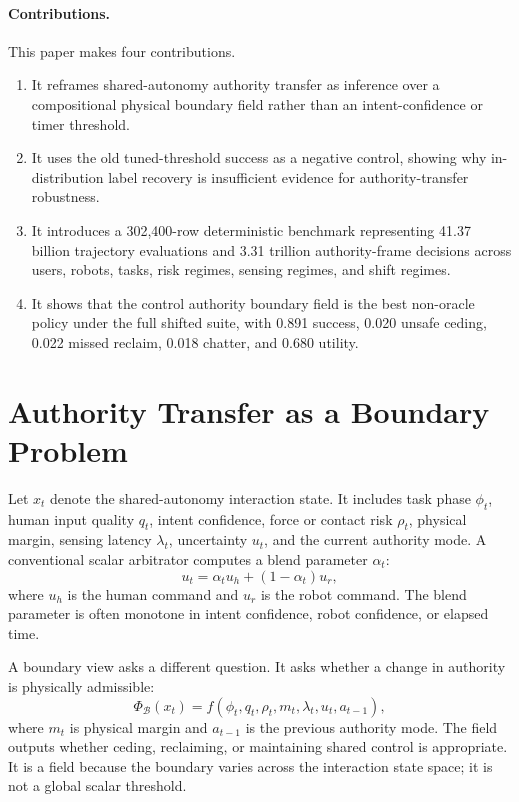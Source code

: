 \documentclass{article}
\newcommand{\state}{x}
\newcommand{\boundary}{\mathcal{B}}
\newcommand{\field}{\Phi_{\boundary}}
\newcommand{\risk}{\rho}
\newcommand{\quality}{q}
\newcommand{\phase}{\phi}
\newcommand{\latency}{\lambda}
\newcommand{\uncert}{u}
\begin{document}
\paragraph{Contributions.}
This paper makes four contributions.
\begin{enumerate}[leftmargin=1.5em]
\item It reframes shared-autonomy authority transfer as inference over a compositional physical boundary field rather than an intent-confidence or timer threshold.
\item It uses the old tuned-threshold success as a negative control, showing why in-distribution label recovery is insufficient evidence for authority-transfer robustness.
\item It introduces a 302,400-row deterministic benchmark representing 41.37 billion trajectory evaluations and 3.31 trillion authority-frame decisions across users, robots, tasks, risk regimes, sensing regimes, and shift regimes.
\item It shows that the control authority boundary field is the best non-oracle policy under the full shifted suite, with 0.891 success, 0.020 unsafe ceding, 0.022 missed reclaim, 0.018 chatter, and 0.680 utility.
\end{enumerate}

\section{Authority Transfer as a Boundary Problem}

Let $\state_t$ denote the shared-autonomy interaction state. It includes task phase $\phase_t$, human input quality $\quality_t$, intent confidence, force or contact risk $\risk_t$, physical margin, sensing latency $\latency_t$, uncertainty $\uncert_t$, and the current authority mode. A conventional scalar arbitrator computes a blend parameter $\alpha_t$:
\[
u_t = \alpha_t u_h + (1-\alpha_t) u_r,
\]
where $u_h$ is the human command and $u_r$ is the robot command. The blend parameter is often monotone in intent confidence, robot confidence, or elapsed time.

A boundary view asks a different question. It asks whether a change in authority is physically admissible:
\[
\field(\state_t) =
  f(\phase_t,\quality_t,\risk_t,m_t,\latency_t,\uncert_t,a_{t-1}),
\]
where $m_t$ is physical margin and $a_{t-1}$ is the previous authority mode. The field outputs whether ceding, reclaiming, or maintaining shared control is appropriate. It is a field because the boundary varies across the interaction state space; it is not a global scalar threshold.
\end{document}
